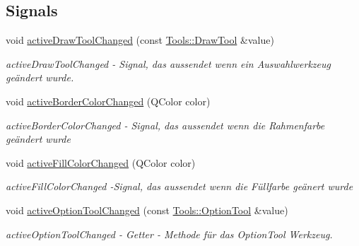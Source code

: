 \subsection*{Signals}
\begin{DoxyCompactItemize}
\item 
void \hyperlink{class_tools_ab5d002810a63050d8a7fd2e1b19b2ba0}{active\+Draw\+Tool\+Changed} (const \hyperlink{class_tools_ab031688a77e89a80ce8b5db7014684a3}{Tools\+::\+Draw\+Tool} \&value)
\begin{DoxyCompactList}\small\item\em active\+Draw\+Tool\+Changed -\/ Signal, das aussendet wenn ein Auswahlwerkzeug geändert wurde. \end{DoxyCompactList}\item 
void \hyperlink{class_tools_a3feb94811769e2b47a1e9ad543bda1f8}{active\+Border\+Color\+Changed} (Q\+Color color)
\begin{DoxyCompactList}\small\item\em active\+Border\+Color\+Changed -\/ Signal, das aussendet wenn die Rahmenfarbe geändert wurde \end{DoxyCompactList}\item 
void \hyperlink{class_tools_a1330acf72b4e751cb873d6538cc5ef2d}{active\+Fill\+Color\+Changed} (Q\+Color color)
\begin{DoxyCompactList}\small\item\em active\+Fill\+Color\+Changed -\/\+Signal, das aussendet wenn die Füllfarbe geänert wurde \end{DoxyCompactList}\item 
void \hyperlink{class_tools_a6ea189495868e06c89d79b36d09b43d7}{active\+Option\+Tool\+Changed} (const \hyperlink{class_tools_a4b55b2ca4eef4d80ae1042233832bb8b}{Tools\+::\+Option\+Tool} \&value)
\begin{DoxyCompactList}\small\item\em active\+Option\+Tool\+Changed -\/ Getter -\/ Methode für das Option\+Tool Werkzeug. \end{DoxyCompactList}\end{DoxyCompactItemize}
